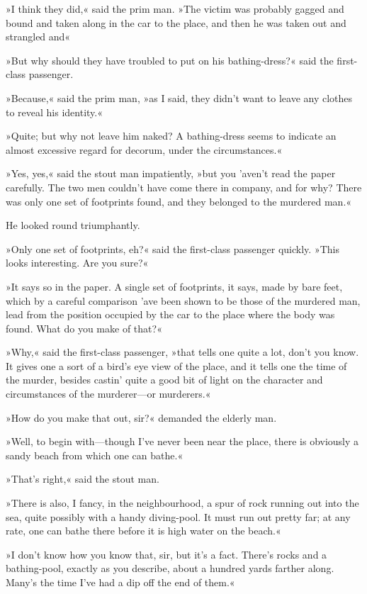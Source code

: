 »I think they did,« said the prim man. »The victim was probably gagged and bound and taken along in the car to the place, and then he was taken out and strangled and\longdash«

»But why should they have troubled to put on his bathing-dress?« said the first-class passenger.

»Because,« said the prim man, »as I said, they didn't want to leave any clothes to reveal his identity.«

»Quite; but why not leave him naked? A bathing-dress seems to indicate an almost excessive regard for decorum, under the circumstances.«

»Yes, yes,« said the stout man impatiently, »but you 'aven't read the paper carefully. The two men couldn't have come there in company, and for why? There was only one set of footprints found, and they belonged to the murdered man.«

He looked round triumphantly.

»Only one set of footprints, eh?« said the first-class passenger quickly. »This looks interesting. Are you sure?«

»It says so in the paper. A single set of footprints, it says, made by bare feet, which by a careful comparison 'ave been shown to be those of the murdered man, lead from the position occupied by the car to the place where the body was found. What do you make of that?«

»Why,« said the first-class passenger, »that tells one quite a lot, don't you know. It gives one a sort of a bird's eye view of the place, and it tells one the time of the murder, besides castin' quite a good bit of light on the character and circumstances of the murderer—or murderers.«

»How do you make that out, sir?« demanded the elderly man.

»Well, to begin with—though I've never been near the place, there is obviously a sandy beach from which one can bathe.«

»That's right,« said the stout man.

»There is also, I fancy, in the neighbourhood, a spur of rock running out into the sea, quite possibly with a handy diving-pool. It must run out pretty far; at any rate, one can bathe there before it is high water on the beach.«

»I don't know how you know that, sir, but it's a fact. There's rocks and a bathing-pool, exactly as you describe, about a hundred yards farther along. Many's the time I've had a dip off the end of them.«

